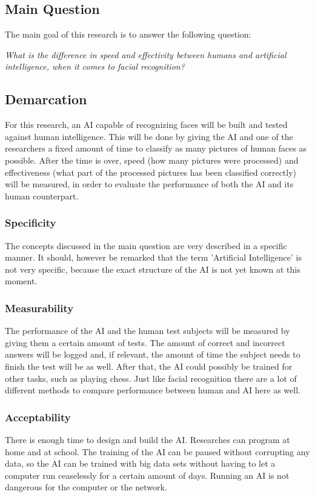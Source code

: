 \documentclass[12pt, titlepage]{article}
\begin{document}
	\subsection{Main Question}
	The main goal of this research is to answer the following question:
	\begin{center}
		\textit{What is the difference in speed and effectivity between humans and artificial 					intelligence, when it comes to facial recognition?}
	\end{center}
	
	\subsection{Demarcation}
	For this research, an AI capable of recognizing faces will be built and tested against human intelligence. This will be done by giving the AI and one of the researchers a fixed amount of time to classify as many pictures of human faces as possible. After the time is over, speed (how many pictures were processed) and effectiveness (what part of the processed pictures has been classified correctly) will be measured, in order to evaluate the performance of both the AI and its human counterpart.
	
	\subsubsection{Specificity}
	The concepts discussed in the main question are very described in a specific manner. It should, however be remarked that the term 'Artificial Intelligence' is not very specific, because the exact structure of the AI is not yet known at this moment. 
	
	\subsubsection{Measurability}
	The performance of the AI and the human test subjects will be measured by giving them a certain amount of tests. The amount of correct and incorrect answers will be logged and, if relevant, the amount of time the subject needs to finish the test will be as well. After that, the AI could possibly be trained for other tasks, such as playing chess. Just like facial recognition there are a lot of different methods to compare performance between human and AI here as well.
	
	\subsubsection{Acceptability}
	There is enough time to design and build the AI. Researches can program at home and at school. The training of the AI can be paused without corrupting any data, so the AI can be trained with big data sets without having to let a computer run ceaselessly for a certain amount of days. Running an AI is not dangerous for the computer or the network.
	
\end{document}
